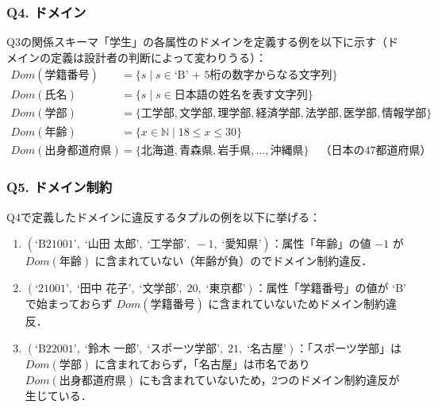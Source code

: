 \subsubsection*{Q4. ドメイン}
Q3の関係スキーマ「学生」の各属性のドメインを定義する例を以下に示す（ドメインの定義は設計者の判断によって変わりうる）：
\begin{align*}
Dom(\text{学籍番号}) &= \{ s \mid s \in \text{`B' + 5桁の数字からなる文字列} \} \\
Dom(\text{氏名}) &= \{ s \mid s \in \text{日本語の姓名を表す文字列}\} \\
Dom(\text{学部}) &= \{\text{工学部}, \text{文学部}, \text{理学部}, \text{経済学部}, \text{法学部}, \text{医学部}, \text{情報学部} \} \\
Dom(\text{年齢}) &= \{ x \in \mathbb{N} \mid 18 \leq x \leq 30 \} \\
Dom(\text{出身都道府県}) &= \{\text{北海道}, \text{青森県}, \text{岩手県}, \ldots, \text{沖縄県}\} \quad \text{（日本の47都道府県）}
\end{align*}

\subsubsection*{Q5. ドメイン制約}
Q4で定義したドメインに違反するタプルの例を以下に挙げる：
\begin{enumerate}
    \item $(\text{`B21001'},\; \text{`山田 太郎'},\; \text{`工学部'},\; -1,\; \text{`愛知県'})$：属性「年齢」の値 $-1$ が $Dom(\text{年齢})$ に含まれていない（年齢が負）のでドメイン制約違反．
    \item $(\text{`21001'},\; \text{`田中 花子'},\; \text{`文学部'},\; 20,\; \text{`東京都'})$：属性「学籍番号」の値が `B' で始まっておらず $Dom(\text{学籍番号})$ に含まれていないためドメイン制約違反．
    \item $(\text{`B22001'},\; \text{`鈴木 一郎'},\; \text{`スポーツ学部'},\; 21,\; \text{`名古屋'})$：「スポーツ学部」は $Dom(\text{学部})$ に含まれておらず，「名古屋」は市名であり $Dom(\text{出身都道府県})$ にも含まれていないため，2つのドメイン制約違反が生じている．
\end{enumerate}

